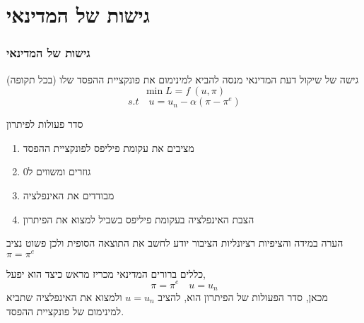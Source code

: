 \documentclass[usenames,dvipsnames]{beamer}
\begin{document}
\begin{RTL}
\begin{frame}[allowframebreaks]
\begin{center}
            
    \end{center}

\end{frame}
\section{גישות של המדינאי}
\begin{frame}[allowframebreaks]
    \frametitle{גישות של המדינאי}
    \begin{block}{גישה של שיקול דעת}
        המדינאי מנסה להביא למינימום את פונקציית ההפסד שלו (בכל תקופה)
        $$\min L = f \ (u,\pi)$$
        $$s.t \quad u = u_n - \alpha(\pi - \pi^e)$$
    \end{block}
    \begin{exampleblock}{סדר פעולות לפיתרון}
        \begin{enumerate}
            \item מציבים את עקומת פיליפס לפונקציית ההפסד
            \item גוזרים ומשווים ל0
            \item מבודדים את האינפלציה
            \item הצבת האינפלציה  בעקומת פיליפס בשביל למצוא את הפיתרון
        \end{enumerate}
    \end{exampleblock}
    \begin{alertblock}{הערה}
        במידה והציפיות רציונליות הציבור יודע לחשב את התוצאה הסופית ולכן פשוט נציב $\pi = \pi^e$
    \end{alertblock}
    \framebreak
    \begin{block}{כללים ברורים}
        המדינאי מכריז מראש כיצד הוא יפעל, 
        $$\pi = \pi^e \quad u = u_n$$
        מכאן, סדר הפעולות של הפיתרון הוא, להציב $u = u_n$ ולמצוא את האינפלציה שתביא למינימום של פונקציית ההפסד.
    \end{block}
\end{frame}


\end{RTL}
\end{document}
